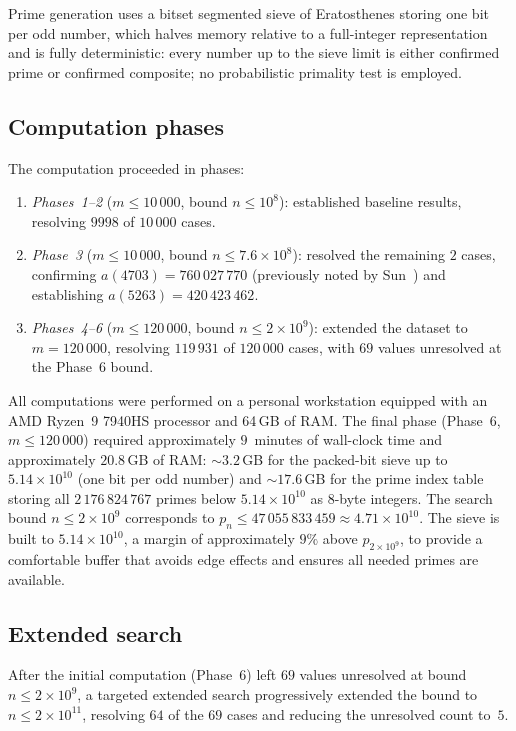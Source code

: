 \documentclass[pdflatex,sn-mathphys-num,Numbered]{sn-jnl}
\theoremstyle{thmstyleone}
\theoremstyle{thmstylethree}
\theoremstyle{thmstyletwo}
\numberwithin{equation}{section}
\begin{document}
Prime generation uses a bitset segmented sieve of Eratosthenes
storing one bit per odd number, which halves memory relative to a
full-integer representation and is fully deterministic: every number
up to the sieve limit is either confirmed prime or confirmed composite;
no probabilistic primality test is employed.

\subsection{Computation phases}
\label{sec:phases}

The computation proceeded in phases:
\begin{enumerate}
	\item \emph{Phases~1--2} ($m \leq 10\,000$, bound $n \leq 10^8$):
	established baseline results, resolving $9998$ of $10\,000$ cases.
	\item \emph{Phase~3} ($m \leq 10\,000$,
	bound $n \leq 7.6 \times 10^8$):
	resolved the remaining $2$ cases, confirming
	$a(4703) = 760\,027\,770$ (previously noted by Sun~\cite{Sun2019})
	and establishing $a(5263) = 420\,423\,462$.
	\item \emph{Phases~4--6} ($m \leq 120\,000$,
	bound $n \leq 2 \times 10^9$):
	extended the dataset to $m = 120\,000$, resolving $119\,931$ of
	$120\,000$ cases, with $69$ values unresolved at the Phase~6 bound.
\end{enumerate}

All computations were performed on a personal workstation equipped with
an AMD Ryzen~9 7940HS processor and 64\,GB of RAM\@.
The final phase (Phase~6, $m \leq 120\,000$) required approximately
$9$~minutes of wall-clock time and approximately $20.8$\,GB of
RAM: $\sim 3.2$\,GB for the packed-bit sieve up to
$5.14 \times 10^{10}$ (one bit per odd number) and $\sim 17.6$\,GB for
the prime index table storing all $2\,176\,824\,767$ primes below
$5.14 \times 10^{10}$ as 8-byte integers.
The search bound $n \leq 2 \times 10^9$ corresponds to
$p_n \leq 47\,055\,833\,459 \approx 4.71 \times 10^{10}$.
The sieve is built to $5.14 \times 10^{10}$, a margin of
approximately $9\%$ above $p_{2 \times 10^9}$, to provide a
comfortable buffer that avoids edge effects and ensures all needed
primes are available.

\subsection{Extended search}
\label{sec:extended}

After the initial computation (Phase~6) left $69$ values unresolved
at bound $n \leq 2 \times 10^9$, a targeted extended search
progressively extended the bound to $n \leq 2 \times 10^{11}$,
resolving $64$ of the $69$ cases and reducing the unresolved count
to~$5$.
\end{document}
